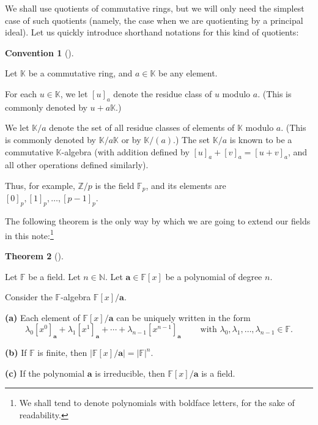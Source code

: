 \documentclass[numbers=enddot,12pt,final,onecolumn,notitlepage]{scrartcl}%
\theoremstyle{definition}
\newtheorem{theo}{Theorem}[subsection]
\newenvironment{theorem}[1][]
{\begin{theo}[#1]\begin{leftbar}}
{\end{leftbar}\end{theo}}
\newtheorem{conv}[theo]{Convention}
\newenvironment{convention}[1][]
{\begin{conv}[#1]\begin{leftbar}}
{\end{leftbar}\end{conv}}
\begin{document}
We shall use quotients of commutative rings, but we will only need the
simplest case of such quotients (namely, the case when we are quotienting by a
principal ideal). Let us quickly introduce shorthand notations for this kind
of quotients:

\begin{convention}
\label{conv.quotient}Let $\mathbb{K}$ be a commutative ring, and
$a\in\mathbb{K}$ be any element.

For each $u\in\mathbb{K}$, we let $\left[  u\right]  _{a}$ denote the residue
class of $u$ modulo $a$. (This is commonly denoted by $u+a\mathbb{K}$.)

We let $\mathbb{K}/a$ denote the set of all residue classes of elements of
$\mathbb{K}$ modulo $a$. (This is commonly denoted by $\mathbb{K}/a\mathbb{K}$
or by $\mathbb{K}/\left(  a\right)  $.) The set $\mathbb{K}/a$ is known to be
a commutative $\mathbb{K}$-algebra (with addition defined by $\left[
u\right]  _{a}+\left[  v\right]  _{a}=\left[  u+v\right]  _{a}$, and all other
operations defined similarly).
\end{convention}

Thus, for example, $\mathbb{Z}/p$ is the field $\mathbb{F}_{p}$, and its
elements are $\left[  0\right]  _{p},\left[  1\right]  _{p},\ldots,\left[
p-1\right]  _{p}$.

The following theorem is the only way by which we are going to extend our
fields in this note:\footnote{We shall tend to denote polynomials with
boldface letters, for the sake of readability.}

\begin{theorem}
\label{thm.field-ext}Let $\mathbb{F}$ be a field. Let $n\in\mathbb{N}$. Let
$\mathbf{a}\in\mathbb{F}\left[  x\right]  $ be a polynomial of degree $n$.

Consider the $\mathbb{F}$-algebra $\mathbb{F}\left[  x\right]  /\mathbf{a}$.

\textbf{(a)} Each element of $\mathbb{F}\left[  x\right]  /\mathbf{a}$ can be
uniquely written in the form%
\[
\lambda_{0}\left[  x^{0}\right]  _{\mathbf{a}}+\lambda_{1}\left[
x^{1}\right]  _{\mathbf{a}}+\cdots+\lambda_{n-1}\left[  x^{n-1}\right]
_{\mathbf{a}}\ \ \ \ \ \ \ \ \ \ \text{with }\lambda_{0},\lambda_{1}%
,\ldots,\lambda_{n-1}\in\mathbb{F}.
\]


\textbf{(b)} If $\mathbb{F}$ is finite, then $\left\vert \mathbb{F}\left[
x\right]  /\mathbf{a}\right\vert =\left\vert \mathbb{F}\right\vert ^{n}$.

\textbf{(c)} If the polynomial $\mathbf{a}$ is irreducible, then
$\mathbb{F}\left[  x\right]  /\mathbf{a}$ is a field.
\end{theorem}
\end{document}
